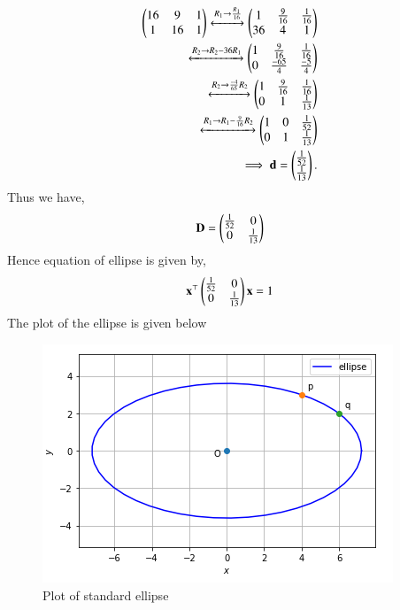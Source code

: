 \begin{align}
\begin{pmatrix}16 & 9 & 1\\ 1 & 16 & 1\end{pmatrix} 
\xleftrightarrow{R_1\rightarrow \frac{R_1}{16}}
\begin{pmatrix}1 & \frac{9}{16} & \frac{1}{16} \\ 36 & 4 & 1\end{pmatrix} 
\\
\xleftrightarrow{R_2\rightarrow R_2-36R_1}
\begin{pmatrix}1 & \frac{9}{16} & \frac{1}{16} \\ 0 & \frac{-65}{4} & \frac{-5}{4}\end{pmatrix} 
\\
\xleftrightarrow{R_2\rightarrow \frac{-4}{65}R_2}
\begin{pmatrix}1 & \frac{9}{16} & \frac{1}{16} \\ 0 & 1 & \frac{1}{13}\end{pmatrix}
\\
\xleftrightarrow{R_1\rightarrow R_1-\frac{9}{16}R_2}
\begin{pmatrix}1 & 0 & \frac{1}{52} \\ 0 & 1 & \frac{1}{13}\end{pmatrix}
\\
\implies \mathbf{d} = \begin{pmatrix}\frac{1}{52} \\ \frac{1}{13}\end{pmatrix}.
\end{align}
Thus we have,
\begin{align}
    \mathbf{D} = \begin{pmatrix}\frac{1}{52} & 0 \\ 0 & \frac{1}{13}\end{pmatrix}
\end{align}
Hence equation of ellipse is given by,
\begin{align}
\mathbf{x}^{\top}\begin{pmatrix}\frac{1}{52} & 0 \\ 0 & \frac{1}{13}\end{pmatrix}\mathbf{x} = 1
\end{align}
The plot of the ellipse is given below
\begin{figure}[ht]
\centering
\includegraphics[width=\columnwidth]{solutions/su2021/2/72/k/ellipse(1).PNG}
\caption{Plot of standard ellipse}
\label{quadform/72/k/Plot of standard ellipse}
\end{figure}
